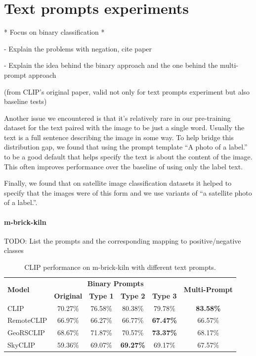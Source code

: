 \documentclass[a4paper, oneside, english]{sapthesis} %
\begin{document}
\section{Text prompts experiments}

* Focus on binary classification *

- Explain the problems with negation, cite paper \cite{quantmeyer2024and}

- Explain the idea behind the binary approach and the one behind the multi-prompt approach

(from CLIP's original paper, valid not only for text prompts experiment but also baseline tests)

Another issue we encountered is that it’s relatively rare in our pre-training dataset for the text paired with the image to be just a single word. Usually the text is a full sentence describing the image in some way. To help bridge this distribution gap, we found that using the prompt template “A photo of a {label}.” to be a good default that helps specify the text is about the content of the image. This often improves performance over the baseline of using only the label text.

Finally, we found that on satellite image classification datasets it helped to specify that the images were of this form and we use variants of “a satellite photo of a {label}.”.


\paragraph{m-brick-kiln}

TODO: List the prompts and the corresponding mapping to positive/negative classes


\begin{table}[ht]
\centering
\footnotesize
\renewcommand{\arraystretch}{1.2}
    \begin{tabular}{lc|cccc}
    \toprule
    \multirow{2}{*}{\textbf{Model}} & \multicolumn{4}{c}{\textbf{Binary Prompts}} &  \multirow{2}{*}{\textbf{Multi-Prompt}}\\
    \cmidrule(lr){2-5}
    & \textbf{Original} & \textbf{Type 1} & \textbf{Type 2} & \textbf{Type 3} \\
    \midrule
    CLIP & 70.27\% & 76.58\% & 80.38\% & 79.78\% & \textbf{83.58\%} \\
    RemoteCLIP & 66.97\% & 66.27\% & 66.77\% & \textbf{67.47\%} & 66.57\% \\
    GeoRSCLIP & 68.67\% & 71.87\% & 70.57\% & \textbf{73.37\%} & 68.17\%\\
    SkyCLIP & 59.36\% & 69.07\% & \textbf{69.27\%} & 69.17\% & 67.57\% \\ 
    \bottomrule
    \end{tabular}
\vspace{0.3cm}
\caption{\normalsize CLIP performance on m-brick-kiln with different text prompts.}
\label{tab:prompts1}
\end{table}
\end{document}
